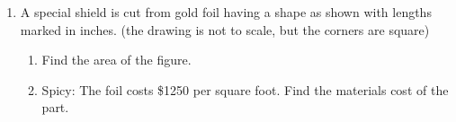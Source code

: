 \documentclass[12pt, twoside]{article}
\begin{document}
\begin{enumerate}
\item A special shield is cut from gold foil having a shape as shown with lengths marked in inches. (the drawing is not to scale, but the corners are square)
  \begin{enumerate}
    \item Find the area of the figure.
      \begin{flushright}
      \end{flushright} \vspace{2cm}
    \item Spicy: The foil costs \$1250 per square foot. Find the materials cost of the part.
  \end{enumerate}

\end{enumerate}
\end{document}
